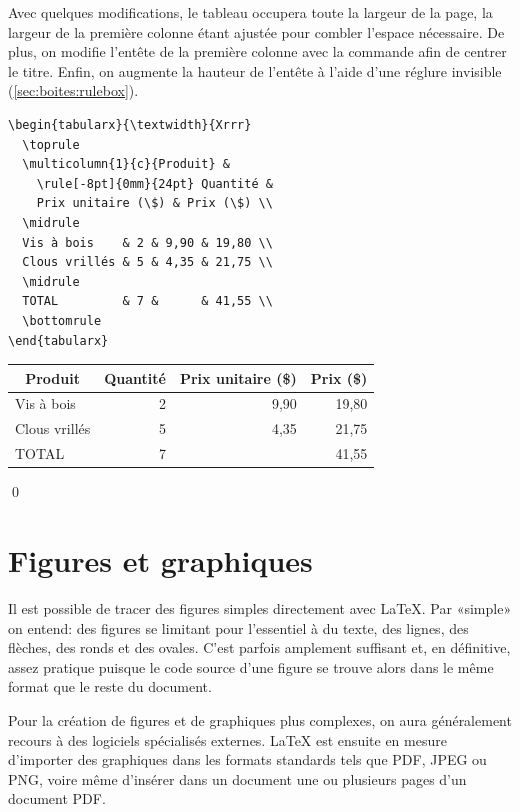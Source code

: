 \begin{exemple}
  Avec quelques modifications, le tableau occupera toute la
  largeur de la page, la largeur de la première colonne étant ajustée
  pour combler l'espace nécessaire. De plus, on modifie l'entête de la
  première colonne avec la commande \cmd{\multicolumn} afin de centrer
  le titre. Enfin, on augmente la hauteur de l'entête à l'aide d'une
  réglure invisible (\autoref{sec:boites:rulebox}).
\begin{lstlisting}
\begin{tabularx}{\textwidth}{Xrrr}
  \toprule
  \multicolumn{1}{c}{Produit} &
    \rule[-8pt]{0mm}{24pt} Quantité &
    Prix unitaire (\$) & Prix (\$) \\
  \midrule
  Vis à bois    & 2 & 9,90 & 19,80 \\
  Clous vrillés & 5 & 4,35 & 21,75 \\
  \midrule
  TOTAL         & 7 &      & 41,55 \\
  \bottomrule
\end{tabularx}
\end{lstlisting}
  \begin{center}
    \begin{tabularx}{\textwidth}{Xrrr}
      \toprule
      \multicolumn{1}{c}{Produit} &
      \rule[-8pt]{0mm}{24pt} Quantité & Prix unitaire (\$) & Prix (\$) \\
      \midrule
      Vis à bois    & 2 & 9,90 & 19,80 \\
      Clous vrillés & 5 & 4,35 & 21,75 \\
      \midrule
      TOTAL         & 7 &      & 41,55 \\
      \bottomrule
    \end{tabularx}
  \end{center}
  \qed
\end{exemple}



\section{Figures et graphiques}
\label{sec:tableaux:figures}

Il est possible de tracer des figures simples directement avec {\LaTeX}. Par «simple» on entend: des figures se
limitant  pour l'essentiel à du texte, des lignes, des flèches, des
ronds et des ovales. C'est parfois amplement suffisant et, en
définitive, assez pratique puisque le code source d'une figure se
trouve alors dans le même format que le reste du document.

Pour la création de figures et de graphiques plus complexes, on aura généralement
recours à des logiciels spécialisés externes. {\LaTeX} est ensuite en
mesure d'importer des graphiques dans les formats standards tels que PDF, JPEG
ou PNG, voire même d'insérer dans un document une ou plusieurs pages
d'un document PDF.


